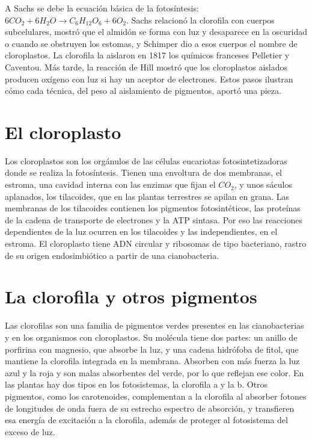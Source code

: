 \documentclass{book}
\begin{document}
A Sachs se debe la ecuación básica de la fotosíntesis: \(6 CO_{2} + 6 H_{2}O \to C_{6}H_{12}O_{6} + 6 O_{2}\). Sachs relacionó la clorofila con cuerpos subcelulares, mostró que el almidón se forma con luz y desaparece en la oscuridad o cuando se obstruyen los estomas, y Schimper dio a esos cuerpos el nombre de cloroplastos. La clorofila la aislaron en 1817 los químicos franceses Pelletier y Caventou. Más tarde, la reacción de Hill mostró que los cloroplastos aislados producen oxígeno con luz si hay un aceptor de electrones. Estos pasos ilustran cómo cada técnica, del peso al aislamiento de pigmentos, aportó una pieza.


\section{El cloroplasto}

Los cloroplastos son los orgánulos de las células eucariotas fotosintetizadoras donde se realiza la fotosíntesis. Tienen una envoltura de dos membranas, el estroma, una cavidad interna con las enzimas que fijan el \(CO_{2}\), y unos sáculos aplanados, los tilacoides, que en las plantas terrestres se apilan en grana. Las membranas de los tilacoides contienen los pigmentos fotosintéticos, las proteínas de la cadena de transporte de electrones y la ATP sintasa. Por eso las reacciones dependientes de la luz ocurren en los tilacoides y las independientes, en el estroma. El cloroplasto tiene ADN circular y ribosomas de tipo bacteriano, rastro de su origen endosimbiótico a partir de una cianobacteria.


\section{La clorofila y otros pigmentos}

Las clorofilas son una familia de pigmentos verdes presentes en las cianobacterias y en los organismos con cloroplastos. Su molécula tiene dos partes: un anillo de porfirina con magnesio, que absorbe la luz, y una cadena hidrófoba de fitol, que mantiene la clorofila integrada en la membrana. Absorben con más fuerza la luz azul y la roja y son malas absorbentes del verde, por lo que reflejan ese color. En las plantas hay dos tipos en los fotosistemas, la clorofila a y la b. Otros pigmentos, como los carotenoides, complementan a la clorofila al absorber fotones de longitudes de onda fuera de su estrecho espectro de absorción, y transfieren esa energía de excitación a la clorofila, además de proteger al fotosistema del exceso de luz.
\end{document}

